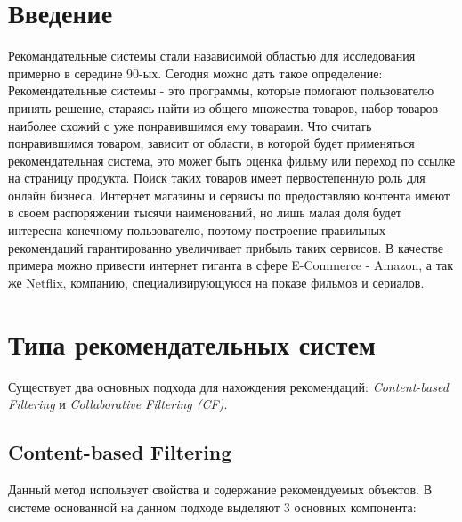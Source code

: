 
\section{Введение}

Рекомандательные системы стали назависимой областью для исследования примерно в середине 90-ых. Сегодня можно дать такое определение: Рекомендательные системы - это программы, которые помогают пользователю принять решение, стараясь найти из общего множества товаров, набор товаров наиболее схожий с уже понравившимся ему товарами. Что считать понравившимся товаром, зависит от области, в которой будет применяться рекомендательная система, это может быть оценка фильму или переход по ссылке на страницу продукта. Поиск таких товаров имеет первостепенную роль для онлайн бизнеса. Интернет магазины и сервисы по предоставляю контента имеют в своем распоряжении тысячи наименований, но лишь малая доля будет интересна конечному пользователю, поэтому построение правильных рекомендаций гарантированно увеличивает прибыль таких сервисов. В качестве примера можно привести интернет гиганта в сфере E-Commerce - Amazon, а так же Netflix, компанию, специализирующуюся на показе фильмов и сериалов.   

\section{Типа рекомендательных систем}

Существует два основных подхода для нахождения рекомендаций: \textit{Content-based Filtering} и \textit{Collaborative Filtering (CF)}.

\subsection{Content-based Filtering}

Данный метод использует свойства и содержание рекомендуемых объектов. В системе основанной на данном подходе выделяют 3 основных компонента:

